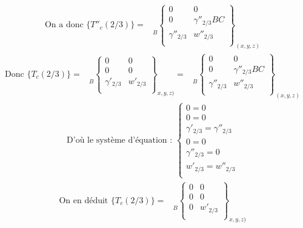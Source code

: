 \documentclass[12pt,a4paper]{report}
\begin{document}
\begin{align*}
\mbox{On a donc }
\{ T''_c (2/3) \} = 
\begin{array}{c}
	\\ \\ \\ 
\end{array} _{B}
\left\{
\begin{array}{cc}
	0 & 0 \\
	0 & \gamma''_{2/3}BC \\
	\gamma''_{2/3} & w''_{2/3} \\
\end{array}
\right\} _{(x, y, z)}
\end{align*}
\begin{align*}
\mbox{Donc }
\{ T_c (2/3) \} = 
\begin{array}{c}
	\\ \\ \\ 
\end{array} _B
\left\{
\begin{array}{cc}
	0 & 0 \\
	0 & 0 \\
	\gamma'_{2/3} & w'_{2/3} \\
\end{array}
\right\} _{x,y,z)} =
\begin{array}{c}
	\\ \\ \\ 
\end{array} _{B}
\left\{
\begin{array}{cc}
	0 & 0 \\
	0 & \gamma''_{2/3}BC \\
	\gamma''_{2/3} & w''_{2/3} \\
\end{array}
\right\} _{(x, y, z)}
\end{align*} 
\begin{align*}
\mbox{D'où le système d'équation : }
\left\{
\begin{array}{l}
0 = 0 \\
0 = 0 \\
\gamma'_{2/3} = \gamma''_{2/3} \\
0 = 0 \\
\gamma''_{2/3} = 0 \\
w'_{2/3} = w''_{2/3} \\
\end{array}
\right. 
\end{align*} 
\begin{align*}
\mbox{On en déduit } 
\{ T_c (2/3) \} = 
\begin{array}{c}
	\\ \\ \\ 
\end{array} _B
\left\{
\begin{array}{cc}
	0 & 0 \\
	0 & 0 \\
	0 & w'_{2/3} \\
\end{array}
\right\} _{x,y,z)}
\end{align*}
\end{document}
